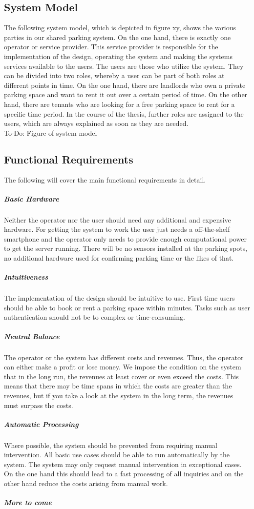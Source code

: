 \documentclass[
a4paper,     %
titlepage,   %
14pt         %
]{scrartcl}  %
\theoremstyle{mystyle}
\begin{document}
\subsection{System Model}
The following system model, which is depicted in figure xy, shows the various parties in our shared parking system. On the one hand, there is exactly one operator or service provider. This service provider is responsible for the implementation of the design, operating the system and making the systems services available to the users. The users are those who utilize the system. They can be divided into two roles, whereby a user can be part of both roles at different points in time. On the one hand, there are landlords who own a private parking space and want to rent it out over a certain period of time. On the other hand, there are tenants who are looking for a free parking space to rent for a specific time period. In the course of the thesis, further roles are assigned to the users, which are always explained as soon as they are needed.\\

To-Do: Figure of system model

\subsection{Functional Requirements}
The following will cover the main functional requirements in detail.
\subparagraph{Basic Hardware} Neither the operator nor the user should need any additional and expensive hardware. For getting the system to work the user just needs a off-the-shelf smartphone and the operator only needs to provide enough computational power to get the server running. There will be no sensors installed at the parking spots, no additional hardware used for confirming parking time or the likes of that.
\subparagraph{Intuitiveness} The implementation of the design should be intuitive to use. First time users should be able to book or rent a parking space within minutes. Tasks such as user authentication should not be to complex or time-consuming.
\subparagraph{Neutral Balance} The operator or the system has different costs and revenues. Thus, the operator can either make a profit or lose money. We impose the condition on the system that in the long run, the revenues at least cover or even exceed the costs. This means that there may be time spans in which the costs are greater than the revenues, but if you take a look at the system in the long term, the revenues must surpass the costs.
\subparagraph{Automatic Processing} Where possible, the system should be prevented from requiring manual intervention. All basic use cases should be able to run automatically by the system. The system may only request manual intervention in exceptional cases. On the one hand this should lead to a fast processing of all inquiries and on the other hand reduce the costs arising from manual work.
\subparagraph{More to come}
\end{document}
